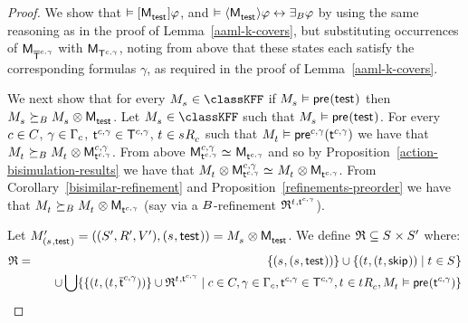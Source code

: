 \begin{proof}
We show that
$\entails \actionA{\aPModel{\aStateTest}} \phi$, and 
$\entails \actionE{\aPModel{\aStateTest}} \phi \iff \someactsBs \phi$
by using the same reasoning as in the proof of Lemma~\ref{aaml-k-covers},
but substituting occurrences of $\aPModel{\aPStatesT[\agentC, \gamma]}$ with $\aPModel{\aStatesT[\agentC, \gamma]}$, noting from above that these states each satisfy the corresponding formulas $\gamma$, as required in the proof of Lemma~\ref{aaml-k-covers}.

We next show that for every $\kPModel{\kStateS} \in \classKFF$ if $\kPModel{\kStateS} \entails \aPrecondition(\aStateTest)$ then $\kPModel{\kStateS} \simulatesBs \kPModel{\kStateS} \exec \aPModel{\aStateTest}$.
Let $\kPModel{\kStateS} \in \classKFF$ such that $\kPModel{\kStateS} \entails \aPrecondition(\aStateTest)$.
For every $\agentC \in \agentsC$, $\gamma \in \Gamma_\agentC$, $\aStateT[\agentC, \gamma] \in \aStatesT[\agentC, \gamma]$, $\kStateT \in \kSuccessorsC{\kStateS}$ such that $\kPModel{\kStateT} \entails \aPrecondition[\agentC,\gamma](\aStateT[\agentC,\gamma])$ we have that $\kPModel{\kStateT} \simulatesBs \kPModel{\kStateT} \exec \aPModel[\agentC, \gamma]{\aStateT[\agentC, \gamma]}$.
From above $\aPModel[\agentC, \gamma]{\aStateT[\agentC, \gamma]} \bisimilar \aPModel{\aStateT[\agentC, \gamma]}$ and so by 
Proposition~\ref{action-bisimulation-results} we have that $\kPModel{\kStateT} \exec \aPModel[\agentC, \gamma]{\aStateT[\agentC, \gamma]} \bisimilar \kPModel{\kStateT} \exec \aPModel{\aStateT[\agentC, \gamma]}$.
From Corollary~\ref{bisimilar-refinement} and Proposition~\ref{refinements-preorder} we have that $\kPModel{\kStateT} \simulatesBs \kPModel{\kStateT} \exec \aPModel{\aStateT[\agentC, \gamma]}$ (say via a $\agentsB$-refinement $\refinement^{\kStateT, \aStateT[\agentC, \gamma]}$).

Let $\kPModelAndTupleP{(\kStateS, \aStateTest)} = \kPModel{\kStateS} \exec \aPModel{\aStateTest}$.
We define $\refinement \subseteq \kStates \times \kStatesP$ where:
\begin{eqnarray*}
\refinement &=& 
\{(\kStateS, (\kStateS, \aStateTest))\} \cup 
\{(\kStateT, (\kStateT, \aStateSkip)) \mid \kStateT \in \kStates\}  \\&&\quad \cup
\bigcup \{\{(\kStateT, (\kStateT, \aPStateT[\agentC, \gamma]))\} \cup \refinement^{\kStateT, \aStateT[\agentC, \gamma]} \mid \agentC \in \agentsC, \gamma \in \Gamma_\agentC, \aStateT[\agentC, \gamma] \in \aStatesT[\agentC, \gamma], \kStateT \in \kSuccessorsC{\kStateT}, \kPModel{\kStateT} \entails \aPrecondition(\aStateT[\agentC, \gamma])\}
\end{eqnarray*}


\end{proof}
